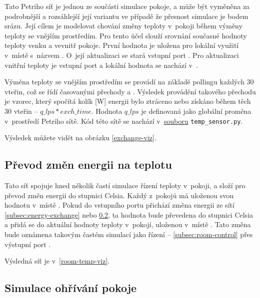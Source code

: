 Tato Petriho síť je jednou ze součásti simulace pokoje, a může být vyměněna za podrobnější a rozsáhlejší její variantu ve případě že přesnost simulace je bodem srázu. Její cílem je modelovat chování změny teploty v~pokoji během výměny teploty se vnějším prostředím. Pro tento účel slouží srovnání současné hodnoty teploty venku a vevnitř pokoje. První hodnota je uložena pro lokální využití v~místě s~názvem . O~její aktualizaci se stará vstupní port . Pro aktualizaci vnitřní teploty je vstupní port  a lokální hodnota se nachází v~.

Výměna teploty se vnějším prostředím se provádí na základě pollingu každých $30$ vteřin, což se řídí časovanými přechody  a . Výsledek provádění takového přechodu je vzorec, který spočítá kolík [W] energii bylo ztráceno nebo získáno během těch $30$ vteřin -- $q\_lps*exch\_time$. Hodnota $q\_lps$ je definovaná jako globální proměna v~prostředí Petriho sítě. Kód této sítě se nachází v~\href{https://github.com/Danil-Grigorev/rt-sim-petry-net/blob/master/sample_nets/temp_sensor.py}{souboru} \texttt{temp\_sensor.py}.

Výsledek můžete vidět na obrázku \ref{exchange-viz}.

\subsection{Převod změn energii na teplotu}

Tato síť spojuje hned několik častí simulace řízení teploty v~pokoji, a složí pro převod změn energii do stupnici Celsia. Každý z~pokojů má uloženou svou hodnotu v~místě . Pokud do vstupního portu  přichází změna energii ze sítí \ref{subsec:energy-exchange} nebo \ref{subsec:room-heating}, ta hodnota bude převedena do stupnici Celsia a přidá se do aktuální hodnoty teploty v~pokojí, uloženou v~místě . Tato změna bude oznámena takovým častém simulací jako řízení -- \ref{subsec:room-control} přes výstupní port .

Výsledná síť je v~\ref{room-temp-viz}.

\subsection{Simulace ohřívání pokoje}
\label{subsec:room-heating}

